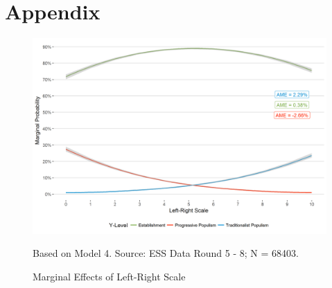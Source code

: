 \newpage
\section{Appendix}

\setcounter{table}{0}
\renewcommand{\thetable}{A\arabic{table}}

\setcounter{figure}{0}
\renewcommand{\thefigure}{A\arabic{figure}}

\begin{figure}[!h]
	\caption{Marginal Effects of Left-Right Scale}
	\label{lrscale_probs}
	\includegraphics[width=\textwidth]{images/lrscale_probs.png}
	\flushright
	{\scriptsize Based on Model 4. Source: ESS Data Round 5 - 8; N = 68403. \par}
\end{figure}





